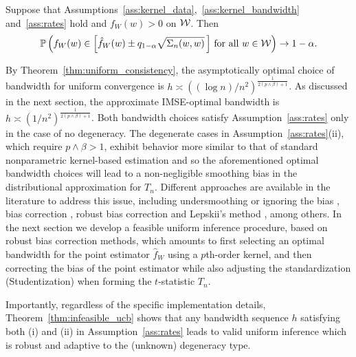 \begin{theorem}
  \label{thm:infeasible_ucb}

  Suppose that Assumptions~\ref{ass:kernel_data},~\ref{ass:kernel_bandwidth}
  and~\ref{ass:rates} hold and
  $f_W(w) > 0$ on $\mathcal{W}$.
  Then
  \begin{align*}
    \mathbb{P}\left(
      f_W(w)
      \in
      \left[
        \hat f_W(w)
        \pm
        q_{1-\alpha}
        \sqrt{\Sigma_n(w,w)}
      \, \right]
      \, \textup{for all }
      w \in \mathcal{W}
    \right)
    \to 1 - \alpha.
  \end{align*}
\end{theorem}

By Theorem~\ref{thm:uniform_consistency},
the asymptotically optimal choice of bandwidth
for uniform convergence is
$h \asymp ((\log n)/n^2)^{\frac{1}{2(p \wedge \beta)+1}}$.
As discussed in the next section, the approximate
IMSE-optimal bandwidth is
$h \asymp (1/n^2)^{\frac{1}{2(p \wedge \beta)+1}}$.
Both bandwidth choices satisfy Assumption~\ref{ass:rates}
only in the case of no degeneracy.
The degenerate cases in Assumption~\ref{ass:rates}(ii),
which require $p \wedge \beta > 1$,
exhibit behavior more similar to that of standard
nonparametric kernel-based estimation
and so the aforementioned optimal bandwidth
choices will lead to a non-negligible smoothing bias in the distributional
approximation for $T_n$.
Different approaches are available in the literature to address this issue,
including undersmoothing or ignoring the bias \citep{hall2001bootstrapping},
bias correction \citep{hall1992effect}, robust bias correction
\citep{Calonico-Cattaneo-Farrell_2018_JASA,
Calonico-Cattaneo-Farrell_2022_Bernoulli}
and Lepskii's method \citep{lepskii1992asymptotically,birge2001alternative},
among others.
In the next section we develop a feasible uniform inference procedure,
based on robust bias correction methods,
which amounts to first selecting an optimal bandwidth for the point estimator
$\hat{f}_W$ using a $p$th-order kernel,
and then correcting the bias of the point estimator while also adjusting
the standardization (Studentization) when forming the $t$-statistic $T_n$.

Importantly, regardless of the specific implementation details,
Theorem~\ref{thm:infeasible_ucb} shows that any bandwidth sequence $h$
satisfying both (i) and (ii)
in Assumption~\ref{ass:rates} leads to valid uniform inference which is robust
and adaptive to the (unknown) degeneracy type.

